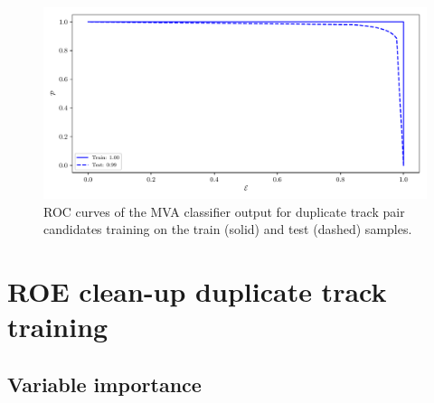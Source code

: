 \documentclass[headings=standardclasses,headings=big,oneside,a4paper,openany,12pt]{scrbook}
\begin{document}
\begin{figure}[H]
\centering
\captionsetup{width=0.8\linewidth}
\includegraphics[width=\linewidth]{fig/addendums/dup_roc}
\caption{ROC curves of the MVA classifier output for duplicate track pair candidates training on the train (solid) and test (dashed) samples.}
\end{figure}

\section*{ROE clean-up duplicate track training}

\subsection*{Variable importance}
\end{document}
